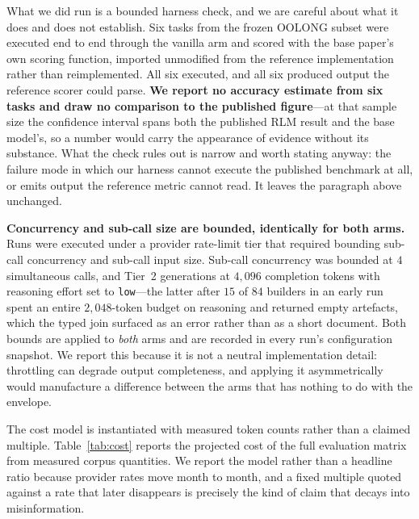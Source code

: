 \documentclass[conference]{IEEEtran}
\begin{document}
What we did run is a bounded harness check, and we are careful about what it
does and does not establish. Six tasks from the frozen OOLONG subset were
executed end to end through the vanilla arm and scored with the base paper's
own scoring function, imported unmodified from the reference implementation
rather than reimplemented. All six executed, and all six produced output the
reference scorer could parse. \textbf{We report no accuracy estimate from six
tasks and draw no comparison to the published figure}---at that sample size the
confidence interval spans both the published RLM result and the base model's,
so a number would carry the appearance of evidence without its substance. What
the check rules out is narrow and worth stating anyway: the failure mode in
which our harness cannot execute the published benchmark at all, or emits
output the reference metric cannot read. It leaves the paragraph above
unchanged.

\noindent\textbf{Concurrency and sub-call size are bounded, identically for
both arms.}
Runs were executed under a provider rate-limit tier that required bounding
sub-call concurrency and sub-call input size.
Sub-call concurrency was bounded at $4$ simultaneous calls, and Tier~2
generations at $4{,}096$ completion tokens with reasoning effort set to
\texttt{low}---the latter after $15$ of $84$ builders in an early run spent an
entire $2{,}048$-token budget on reasoning and returned empty artefacts, which
the typed join surfaced as an error rather than as a short document.
Both bounds are applied to \emph{both} arms and are recorded in every run's
configuration snapshot. We report this because it is not a neutral
implementation detail: throttling can degrade output completeness, and
applying it asymmetrically would manufacture a difference between the arms
that has nothing to do with the envelope.

The cost model is instantiated with measured token counts rather than a
claimed multiple. Table~\ref{tab:cost} reports the projected cost of the full
evaluation matrix from measured corpus quantities. We report the model rather
than a headline ratio because provider rates move month to month, and a fixed
multiple quoted against a rate that later disappears is precisely the kind of
claim that decays into misinformation.
\end{document}
